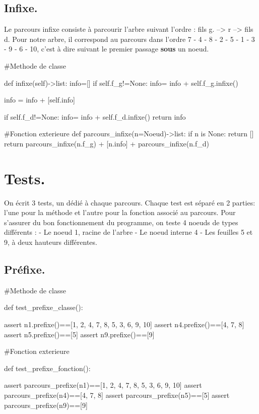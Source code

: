 \documentclass{article}
\begin{document}
\subsection{Infixe.}
Le parcours infixe consiste à parcourir l'arbre suivant l'ordre : fils g. --> r --> fils d.
 Pour notre arbre, il correspond au parcours dans 
 l’ordre 7 - 4 - 8 - 2 - 5 - 1 - 3 - 9 - 6 - 10,
 c'est à dire suivant le premier passage \textbf{sous} un noeud.
\begin{python}
    #Methode de classe

    def infixe(self)->list:
    info=[]
    if self.f_g!=None:
        info= info + self.f_g.infixe() 
         
    info = info + [self.info]
    
    if self.f_d!=None:
        info= info + self.f_d.infixe()
    return info
    
    #Fonction exterieure
    def parcours_infixe(n=Noeud)->list:
    if n is None:
        return []
    return parcours_infixe(n.f_g) + [n.info] + parcours_infixe(n.f_d)

\end{python}
\section{Tests.}
On écrit 3 tests, un dédié à chaque parcours.
Chaque test est séparé en 2 parties: l'une pour la méthode et l'autre pour la fonction associé au parcours.
Pour s'assurer du bon fonctionnement du programme, on teste 4 noeuds de types différents :
\newline
- Le noeud 1, racine de l'arbre
\newline
- Le noeud interne 4
\newline
- Les feuilles 5 et 9, à deux hauteurs différentes.
\subsection{Préfixe.}


\begin{python}

    #Methode de classe

    def test_prefixe_classe():
        
        assert n1.prefixe()==[1, 2, 4, 7, 8, 5, 3, 6, 9, 10]
        assert n4.prefixe()==[4, 7, 8]
        assert n5.prefixe()==[5]
        assert n9.prefixe()==[9]

    #Fonction exterieure

    def test_prefixe_fonction():
    
        assert parcours_prefixe(n1)==[1, 2, 4, 7, 8, 5, 3, 6, 9, 10]
        assert parcours_prefixe(n4)==[4, 7, 8]
        assert parcours_prefixe(n5)==[5]
        assert parcours_prefixe(n9)==[9]
\end{python}
\end{document}
